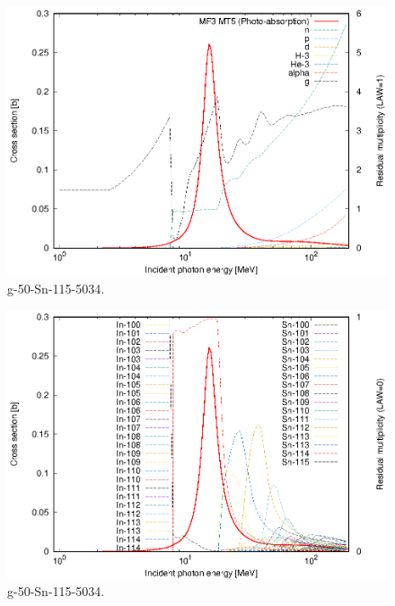 \begin{figure}
 \includegraphics[width=\linewidth]{eps/g_50-Sn-115_5034.eps}
  \caption{g-50-Sn-115-5034.}
\end{figure}
\begin{figure}
 \includegraphics[width=\linewidth]{eps-law0/g_50-Sn-115_5034.eps}
 \caption{g-50-Sn-115-5034.}
\end{figure}
\newpage \clearpage

